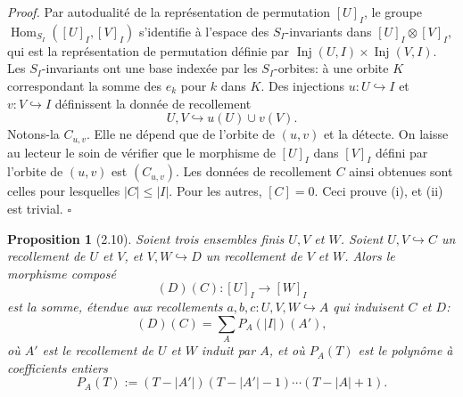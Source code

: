 \documentclass[11pt]{article}
\newcommand{\Hom}{\operatorname{Hom}}
\newcommand{\Inj}{\operatorname{Inj}}
\theoremstyle{deligne}
\newtheorem*{proposition*}{Proposition}
\newenvironment{proofdel}{\textit{Proof.}}{\hfill$\square$}
\begin{document}
\begin{proofdel}
Par autodualité de la représentation de permutation \([U]_I\), le groupe \(\Hom_{S_I}([U]_I,[V]_I)\) s'identifie à l'espace des \(S_I\)-invariants dans \([U]_I\otimes[V]_I\), qui est la représentation de permutation définie par \(\Inj(U,I)\times\Inj(V,I)\). Les \(S_I\)-invariants ont une base indexée par les \(S_I\)-orbites: à une orbite \(K\) correspondant la somme des \(e_k\) pour \(k\) dans \(K\). Des injections \(u:U\hookrightarrow I\) et \(v:V\hookrightarrow I\) définissent la donnée de recollement
\[
  U,V\hookrightarrow u(U)\cup v(V).
\]
Notons-la \(C_{u,v}\). Elle ne dépend que de l'orbite de \((u,v)\) et la détecte. On laisse au lecteur le soin de vérifier que le morphisme de \([U]_I\) dans \([V]_I\) défini par l'orbite de \((u,v)\) est \((C_{u,v})\). Les données de recollement \(C\) ainsi obtenues sont celles pour lesquelles \(|C|\le |I|\). Pour les autres, \([C]=0\). Ceci prouve (i), et (ii) est trivial.
\end{proofdel}

\begin{proposition*}[2.10]
Soient trois ensembles finis \(U,V\) et \(W\). Soient \(U,V\hookrightarrow C\) un recollement de \(U\) et \(V\), et \(V,W\hookrightarrow D\) un recollement de \(V\) et \(W\). Alors le morphisme composé
\[
  (D)(C):[U]_I\longrightarrow[W]_I
\]
est la somme, étendue aux recollements \(a,b,c:U,V,W\hookrightarrow A\) qui induisent \(C\) et \(D\):
\[
  (D)(C)=\sum_A P_A(|I|)(A'),
  \tag{2.10.1}
\]
où \(A'\) est le recollement de \(U\) et \(W\) induit par \(A\), et où \(P_A(T)\) est le polynôme à coefficients entiers
\[
  P_A(T):=(T-|A'|)(T-|A'|-1)\cdots(T-|A|+1).
  \tag{2.10.2}
\]
\end{proposition*}
\end{document}
